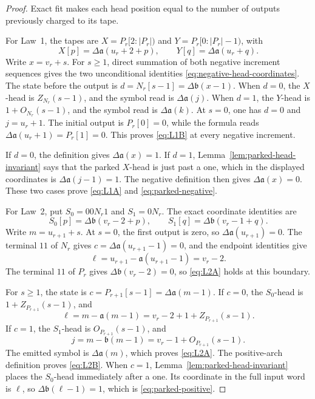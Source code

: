 \documentclass[11pt]{article}
\theoremstyle{definition}
\theoremstyle{remark}
\begin{document}
\begin{proof}
Exact fit makes each head position equal to the number of outputs previously
charged to its tape.

For Law~1, the tapes are \(X=P_r[2:|P_r|)\) and
\(Y=P_r[0:|P_r|-1)\), with
\[
 X[p]=\Delta\mathfrak a(u_r+2+p),
 \qquad
 Y[q]=\Delta\mathfrak a(u_r+q).
\]
Write \(x=v_r+s\).  For \(s\geq1\), direct summation of both negative
increment sequences gives the two unconditional identities
\eqref{eq:negative-head-coordinates}.  The state before the output is
\(d=N_r[s-1]=\Delta\mathfrak b(x-1)\).  When \(d=0\), the \(X\)-head is
\(Z_{N_r}(s-1)\), and the symbol read is \(\Delta\mathfrak a(j)\).  When
\(d=1\), the \(Y\)-head is \(1+O_{N_r}(s-1)\), and the symbol read is
\(\Delta\mathfrak a(k)\).  At \(s=0\), one has
\(d=0\) and \(j=u_r+1\).  The initial output is \(P_r[0]=0\), while the
formula reads \(\Delta\mathfrak a(u_r+1)=P_r[1]=0\).  This proves
\eqref{eq:L1B} at every negative increment.

If \(d=0\), the definition gives \(\Delta\mathfrak a(x)=1\).  If \(d=1\),
Lemma~\ref{lem:parked-head-invariant} says that the parked \(X\)-head is just
past a one, which in the displayed coordinates is
\(\Delta\mathfrak a(j-1)=1\).  The negative definition then gives
\(\Delta\mathfrak a(x)=0\).  These two cases prove \eqref{eq:L1A} and
\eqref{eq:parked-negative}.

For Law~2, put \(S_0=00N_r1\) and \(S_1=0N_r\).  The exact coordinate
identities are
\[
 S_0[p]=\Delta\mathfrak b(v_r-2+p),
 \qquad
 S_1[q]=\Delta\mathfrak b(v_r-1+q).
\]
Write \(m=u_{r+1}+s\).  At \(s=0\), the first output is zero, so
\(\Delta\mathfrak a(u_{r+1})=0\).  The terminal \(11\) of \(N_r\) gives
\(c=\Delta\mathfrak a(u_{r+1}-1)=0\), and the endpoint identities give
\[
 \ell=u_{r+1}-\mathfrak a(u_{r+1}-1)=v_r-2.
\]
The terminal \(11\) of \(P_r\) gives
\(\Delta\mathfrak b(v_r-2)=0\), so \eqref{eq:L2A} holds at this boundary.

For \(s\geq1\), the state is
\(c=P_{r+1}[s-1]=\Delta\mathfrak a(m-1)\).  If \(c=0\), the \(S_0\)-head
is \(1+Z_{P_{r+1}}(s-1)\), and
\[
 \ell=m-\mathfrak a(m-1)
 =v_r-2+1+Z_{P_{r+1}}(s-1).
\]
If \(c=1\), the \(S_1\)-head is \(O_{P_{r+1}}(s-1)\), and
\[
 j=m-\mathfrak b(m-1)=v_r-1+O_{P_{r+1}}(s-1).
\]
The emitted symbol is \(\Delta\mathfrak a(m)\), which proves
\eqref{eq:L2A}.  The positive-arch definition proves \eqref{eq:L2B}.
When \(c=1\), Lemma~\ref{lem:parked-head-invariant} places the \(S_0\)-head
immediately after a one.  Its coordinate in the full input word is \(\ell\), so
\(\Delta\mathfrak b(\ell-1)=1\), which is
\eqref{eq:parked-positive}.
\end{proof}
\end{document}
